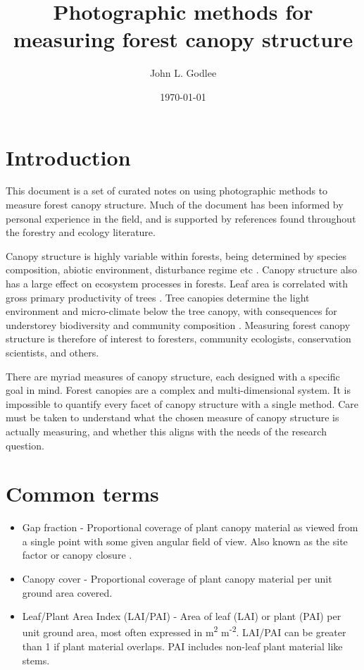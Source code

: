 \documentclass[11pt,a4paper]{article}
\title{Photographic methods for measuring forest canopy structure}
\date{\today}
\author{John L. Godlee}
\begin{document}
\maketitle

\tableofcontents
\newpage

\section{Introduction}

This document is a set of curated notes on using photographic methods to measure forest canopy structure. Much of the document has been informed by personal experience in the field, and is supported by references found throughout the forestry and ecology literature. 

Canopy structure is highly variable within forests, being determined by species composition, abiotic environment, disturbance regime etc \citep{Fotis2018}. Canopy structure also has a large effect on ecosystem processes in forests. Leaf area is correlated with gross primary productivity of trees \citep{Chen2012}. Tree canopies determine the light environment and micro-climate below the tree canopy, with consequences for understorey biodiversity and community composition \citep{Bartels2010, Barbier2008}. Measuring forest canopy structure is therefore of interest to foresters, community ecologists, conservation scientists, and others.

There are myriad measures of canopy structure, each designed with a specific goal in mind. Forest canopies are a complex and multi-dimensional system. It is impossible to quantify every facet of canopy structure with a single method. Care must be taken to understand what the chosen measure of canopy structure is actually measuring, and whether this aligns with the needs of the research question.

\section{Common terms}

\begin{itemize}
	\item{Gap fraction - Proportional coverage of plant canopy material as viewed from a single point with some given angular field of view. Also known as the site factor or canopy closure \citep{Anderson1964}.}
	\item{Canopy cover - Proportional coverage of plant canopy material per unit ground area covered.}
	\item{Leaf/Plant Area Index (LAI/PAI) - Area of leaf (LAI) or plant (PAI) per unit ground area, most often expressed in m\textsuperscript{2} m\textsuperscript{-2}. LAI/PAI can be greater than 1 if plant material overlaps. PAI includes non-leaf plant material like stems.}
\end{itemize}
\end{document}
